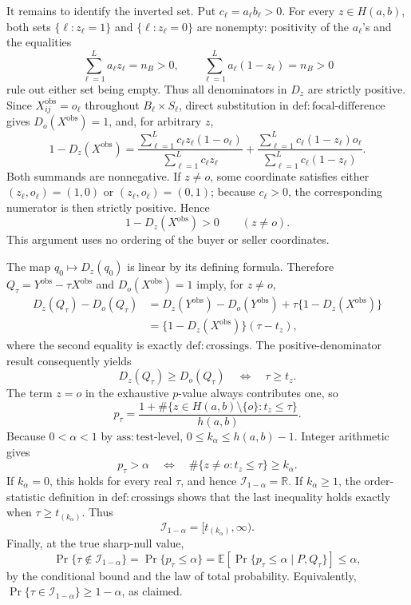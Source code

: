 It remains to identify the inverted set.  Put \(c_\ell=a_\ell b_\ell>0\).  For every \(z\in H(a,b)\), both sets \(\{\ell:z_\ell=1\}\) and \(\{\ell:z_\ell=0\}\) are nonempty: positivity of the \(a_\ell\)'s and the equalities
\[
 \sum_{\ell=1}^{L}a_\ell z_\ell=n_B>0,
 \qquad
 \sum_{\ell=1}^{L}a_\ell(1-z_\ell)=n_B>0
\]
rule out either set being empty.  Thus all denominators in \(D_z\) are strictly positive.  Since \(X_{ij}^{\mathrm{obs}}=o_\ell\) throughout \(B_\ell\times S_\ell\), direct substitution in \(\mathrm{def{:}focal\mbox{-}difference}\) gives \(D_o(X^{\mathrm{obs}})=1\), and, for arbitrary \(z\),
\[
 1-D_z(X^{\mathrm{obs}})
 =
 \frac{\sum_{\ell=1}^{L}c_\ell z_\ell(1-o_\ell)}
 {\sum_{\ell=1}^{L}c_\ell z_\ell}
 +
 \frac{\sum_{\ell=1}^{L}c_\ell(1-z_\ell)o_\ell}
 {\sum_{\ell=1}^{L}c_\ell(1-z_\ell)}.
\]
Both summands are nonnegative.  If \(z\ne o\), some coordinate satisfies either \((z_\ell,o_\ell)=(1,0)\) or \((z_\ell,o_\ell)=(0,1)\); because \(c_\ell>0\), the corresponding numerator is then strictly positive.  Hence
\[
 1-D_z(X^{\mathrm{obs}})>0
 \qquad(z\ne o).
\]
This argument uses no ordering of the buyer or seller coordinates.

The map \(q_0\mapsto D_z(q_0)\) is linear by its defining formula.  Therefore \(Q_\tau=Y^{\mathrm{obs}}-\tau X^{\mathrm{obs}}\) and \(D_o(X^{\mathrm{obs}})=1\) imply, for \(z\ne o\),
\[
 \begin{aligned}
 D_z(Q_\tau)-D_o(Q_\tau)
 &=D_z(Y^{\mathrm{obs}})-D_o(Y^{\mathrm{obs}})
   +\tau\{1-D_z(X^{\mathrm{obs}})\}\\
 &=\{1-D_z(X^{\mathrm{obs}})\}(\tau-t_z),
 \end{aligned}
\]
where the second equality is exactly \(\mathrm{def{:}crossings}\).  The positive-denominator result consequently yields
\[
 D_z(Q_\tau)\ge D_o(Q_\tau)
 \quad\Longleftrightarrow\quad
 \tau\ge t_z.
\]
The term \(z=o\) in the exhaustive \(p\)-value always contributes one, so
\[
 p_\tau
 =\frac{1+\#\{z\in H(a,b)\setminus\{o\}:t_z\le\tau\}}
 {h(a,b)}.
\]
Because \(0<\alpha<1\) by \(\mathrm{ass{:}test\mbox{-}level}\), \(0\le k_\alpha\le h(a,b)-1\).  Integer arithmetic gives
\[
 p_\tau>\alpha
 \quad\Longleftrightarrow\quad
 \#\{z\ne o:t_z\le\tau\}\ge k_\alpha.
\]
If \(k_\alpha=0\), this holds for every real \(\tau\), and hence \(\mathcal I_{1-\alpha}=\mathbb R\).  If \(k_\alpha\ge1\), the order-statistic definition in \(\mathrm{def{:}crossings}\) shows that the last inequality holds exactly when \(\tau\ge t_{(k_\alpha)}\).  Thus
\[
 \mathcal I_{1-\alpha}=[t_{(k_\alpha)},\infty).
\]
Finally, at the true sharp-null value,
\[
 \Pr\{\tau\notin\mathcal I_{1-\alpha}\}
 =\Pr\{p_\tau\le\alpha\}
 =\mathbb E\!\left[
   \Pr\{p_\tau\le\alpha\mid P,Q_\tau\}
 \right]
 \le\alpha,
\]
by the conditional bound and the law of total probability.  Equivalently, \(\Pr\{\tau\in\mathcal I_{1-\alpha}\}\ge1-\alpha\), as claimed.
